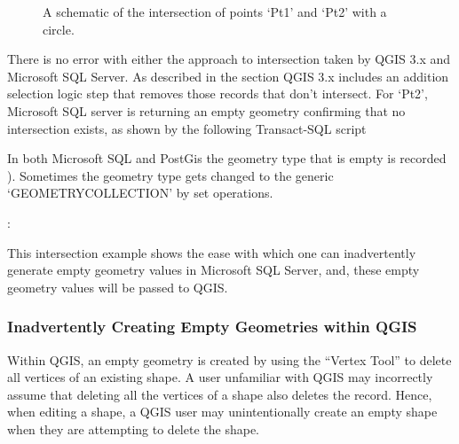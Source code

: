 \documentclass[letterpaper,11pt,english]{sphinxmanual}
\begin{document}
\begin{figure}[htbp]
\centering
\capstart

\noindent{}
\caption{A schematic of the intersection of points ‘Pt1’ and ‘Pt2’ with a circle.}\label{\detokenize{concept:id67}}\label{\detokenize{concept:figurevi}}\end{figure}

There is no error with either the approach to intersection taken by QGIS 3.x and Microsoft SQL Server.  As described in the section {\hyperref[\detokenize{concept:records-with-false-boolean-logic}]{}} QGIS 3.x includes an addition selection logic step that removes those records that don’t intersect.  For ‘Pt2’, Microsoft SQL server is returning an empty geometry confirming that no intersection exists, as shown by the following Transact-SQL script %
\begin{footnote}[2]\sphinxAtStartFootnote
In both Microsoft SQL and PostGis the geometry type that is empty is recorded ).  Sometimes the geometry type gets changed to the generic ‘GEOMETRYCOLLECTION’ by set operations.
%
\end{footnote}:

%
\begin{sphinxVerbatim}[commandchars=\\\{\}]
    
    
 
 
\end{sphinxVerbatim}

This intersection example shows the ease with which one can inadvertently generate empty geometry values in Microsoft SQL Server, and, these empty geometry values will be passed to QGIS.


\subsubsection{Inadvertently Creating Empty Geometries within QGIS}
\label{\detokenize{concept:inadvertently-creating-empty-geometries-within-qgis}}
Within QGIS, an empty geometry is created by using the “Vertex Tool” to delete all vertices of an existing shape.  A user unfamiliar with QGIS may incorrectly assume that deleting all the vertices of a shape also deletes the record.  Hence, when editing a shape, a QGIS user may unintentionally create an empty shape when they are attempting to delete the shape.
\end{document}

